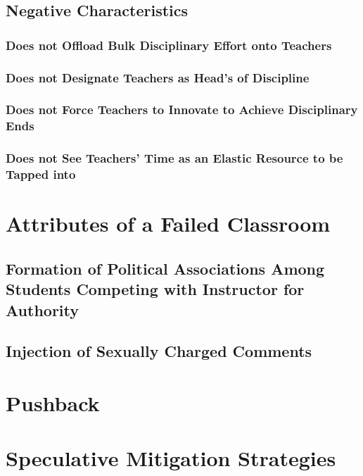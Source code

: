 \documentclass[12pt]{article}
\begin{document}
	\subsection{Negative Characteristics}
	\subsubsection{Does not Offload Bulk Disciplinary Effort onto Teachers}
	\subsubsection{Does not Designate Teachers as Head's of Discipline}
	\subsubsection{Does not Force Teachers to Innovate to Achieve Disciplinary Ends}
	\subsubsection{Does not See Teachers' Time as an Elastic Resource to be Tapped into}
	
	\section{Attributes of a Failed Classroom}
	\subsection{Formation of Political Associations Among Students Competing with Instructor for Authority}
	\subsection{Injection of Sexually Charged Comments}
	
	\section{Pushback}
	
	\section{Speculative Mitigation Strategies}
	
\end{document}
